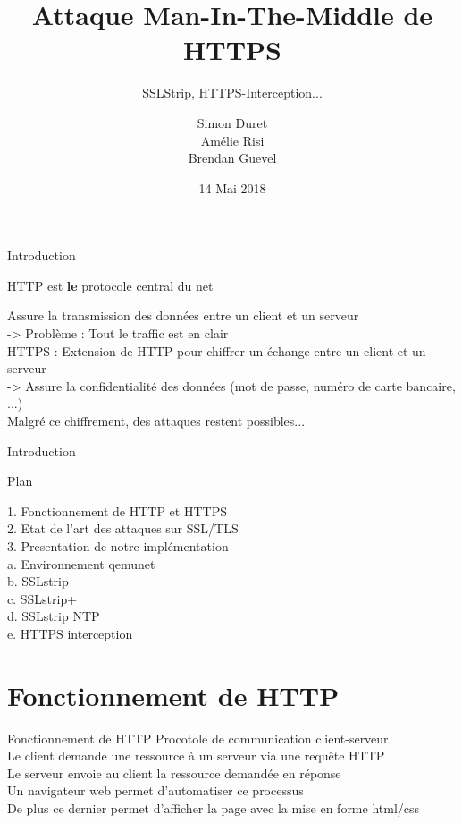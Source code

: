 \documentclass{beamer}
\title[Attaques sur HTTPS]{Attaque Man-In-The-Middle de HTTPS}
\subtitle{SSLStrip, HTTPS-Interception...}
\author[S. Duret - A. Risi - B. Guevel]{Simon Duret\\Amélie Risi\\Brendan Guevel}
\institute[]{Université de Bordeaux}
\date{14 Mai 2018}
\begin{document}
\begin{frame}
	\titlepage
\end{frame}

\begin{frame}{Introduction}
    {\Large \centerline{HTTP est \textbf{le} protocole central du net}}

    Assure la transmission des données entre un client et un serveur \\
    -> Problème : Tout le traffic est en clair \\
    HTTPS : Extension de HTTP pour chiffrer un échange entre un client et un serveur \\
    -> Assure la confidentialité des données (mot de passe, numéro de carte bancaire, ...) \\

    Malgré ce chiffrement, des attaques restent possibles...

\end{frame}

\begin{frame}{Introduction}
    {\Large \centerline{Plan}}

    1. Fonctionnement de HTTP et HTTPS \\
    2. Etat de l'art des attaques sur SSL/TLS \\
    3. Presentation de notre implémentation \\
        a. Environnement qemunet \\
        b. SSLstrip \\
        c. SSLstrip+ \\
        d. SSLstrip NTP \\
        e. HTTPS interception \\

\end{frame}

\section{Fonctionnement de HTTP}

\begin{frame}{Fonctionnement de HTTP}
    Procotole de communication client-serveur \\
    Le client demande une ressource à un serveur via une requête HTTP \\
    Le serveur envoie au client la ressource demandée en réponse \\
    Un navigateur web permet d'automatiser ce processus \\
    De plus ce dernier permet d'afficher la page avec la mise en forme html/css

\end{frame}
\end{document}

